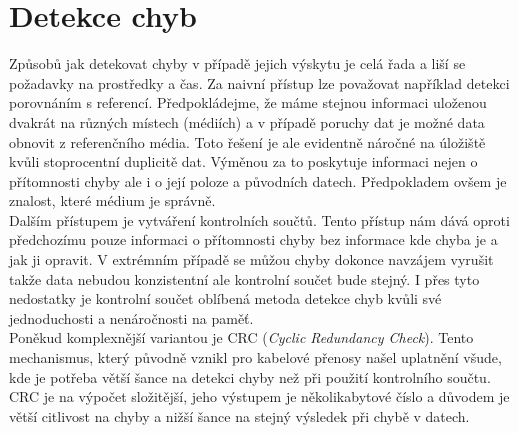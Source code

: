 \section{Detekce chyb}
\label{sec:errordetection}
Způsobů jak detekovat chyby v případě jejich výskytu je celá řada a liší se požadavky na prostředky a čas. Za naivní přístup lze považovat například detekci porovnáním s referencí. Předpokládejme, že máme stejnou informaci uloženou dvakrát na různých místech (médiích) a v případě poruchy dat je možné data obnovit z referenčního média. Toto řešení je ale evidentně náročné na úložiště kvůli stoprocentní duplicitě dat. Výměnou za to poskytuje informaci nejen o přítomnosti chyby ale i o její poloze a původních datech. Předpokladem ovšem je znalost, které médium je správně.\\ 
Dalším přístupem je vytváření kontrolních součtů. Tento přístup nám dává oproti předchozímu pouze informaci o přítomnosti chyby bez informace kde chyba je a jak ji opravit. V extrémním případě se můžou chyby dokonce navzájem vyrušit takže data nebudou konzistentní ale kontrolní součet bude stejný. I přes tyto nedostatky je kontrolní součet oblíbená metoda detekce chyb kvůli své jednoduchosti a nenáročnosti na paměť.\\
Poněkud komplexnější variantou je CRC (\textit{Cyclic Redundancy Check}). Tento mechanismus, který původně vznikl pro kabelové přenosy našel uplatnění všude, kde je potřeba větší šance na detekci chyby než při použití kontrolního součtu. CRC je na výpočet složitější, jeho výstupem je několikabytové číslo a důvodem je větší citlivost na chyby a nižší šance na stejný výsledek při chybě v datech. 

